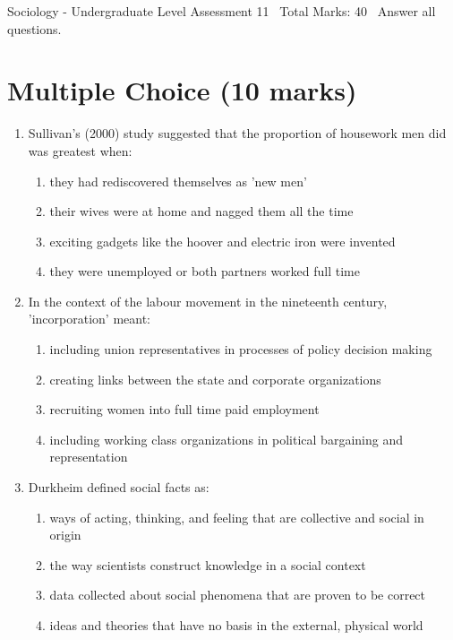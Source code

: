 \documentclass[12pt]{article}
\begin{document}
\begin{center}
Sociology - Undergraduate Level Assessment 11 \
Total Marks: 40 \
Answer all questions.
\end{center}

\section*{Multiple Choice (10 marks)}
\begin{enumerate}[label=\arabic*.]
\item Sullivan's (2000) study suggested that the proportion of housework men did was greatest when:
\begin{enumerate}[label=(\alph*)]
    \item they had rediscovered themselves as 'new men'
    \item their wives were at home and nagged them all the time
    \item exciting gadgets like the hoover and electric iron were invented
    \item they were unemployed or both partners worked full time
\end{enumerate}
\item In the context of the labour movement in the nineteenth century, 'incorporation' meant:
\begin{enumerate}[label=(\alph*)]
    \item including union representatives in processes of policy decision making
    \item creating links between the state and corporate organizations
    \item recruiting women into full time paid employment
    \item including working class organizations in political bargaining and representation
\end{enumerate}
\item Durkheim defined social facts as:
\begin{enumerate}[label=(\alph*)]
    \item ways of acting, thinking, and feeling that are collective and social in origin
    \item the way scientists construct knowledge in a social context
    \item data collected about social phenomena that are proven to be correct
    \item ideas and theories that have no basis in the external, physical world
\end{enumerate}

\end{enumerate}
\end{document}
